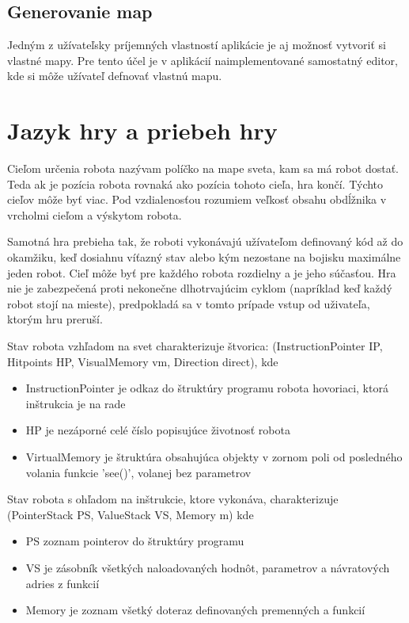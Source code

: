 \subsection{Generovanie map}%
Jedným z užívateľsky príjemných vlastností aplikácie je aj možnosť vytvoriť si vlastné mapy. Pre tento účel je v aplikácií naimplementované samostatný editor, kde si môže užívateľ defnovať vlastnú mapu.
\section{Jazyk hry a priebeh hry} %
\begin{definicia}
Cieľom určenia robota nazývam políčko na mape sveta, kam sa má robot dostať. Teda ak je pozícia robota rovnaká ako pozícia tohoto cieľa, hra končí. Týchto cieľov môže byť viac.  Pod vzdialenosťou rozumiem veľkosť obsahu obdĺžnika v vrcholmi cieľom a výskytom robota. %
\end{definicia}

Samotná hra prebieha tak, že roboti vykonávajú užívateľom definovaný kód až do okamžiku, keď dosiahnu víťazný stav alebo kým nezostane na bojisku maximálne jeden robot. Cieľ môže byť pre každého robota rozdielny a je jeho súčasťou. Hra nie je zabezpečená proti nekonečne dlhotrvajúcim cyklom (napríklad keď každý robot stojí na mieste), predpokladá sa v tomto prípade vstup od uživateľa, ktorým hru preruší.

\begin{definicia}
Stav robota vzhľadom na svet charakterizuje štvorica: (InstructionPointer IP, Hitpoints HP, VisualMemory vm, Direction direct), kde 
\begin{itemize}
\item InstructionPointer je odkaz do štruktúry programu robota hovoriaci, ktorá inštrukcia je na rade
\item HP je nezáporné celé číslo popisujúce životnosť robota
\item VirtualMemory je štruktúra obsahujúca objekty v zornom poli od posledného volania funkcie 'see()', volanej bez parametrov 
\end{itemize}
Stav robota s ohľadom na inštrukcie, ktore vykonáva, charakterizuje (PointerStack PS, ValueStack VS, Memory m) kde
\begin{itemize}
\item PS zoznam pointerov do štruktúry programu
\item VS je zásobník všetkých naloadovaných hodnôt, parametrov  a návratových adries z funkcií
\item Memory je zoznam všetký doteraz definovaných premenných a funkcií
\end{itemize}
\label{StavRobota}
\end{definicia}

